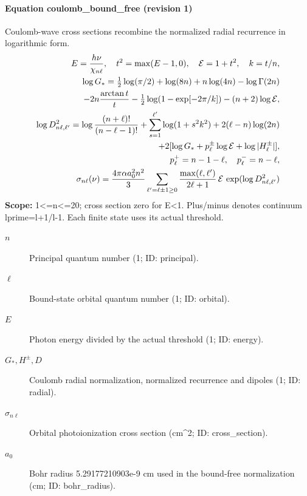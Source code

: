 \paragraph{Equation coulomb\_bound\_free (revision 1)}
Coulomb-wave cross sections recombine the normalized radial recurrence in logarithmic form.
\begin{equation}
\begin{aligned}
E=\frac{h\nu}{\chi_{n\ell}},\quad t^2=\max(E-1,0),\quad \mathcal E=1+t^2,\quad k=t/n,\\
\log G_* =\tfrac12\log(\pi/2)+\log(8n)+n\log(4n)-\log\Gamma(2n)\\
\hspace{7mm}-2n\frac{\arctan t}{t}-\tfrac12\log(1-\exp[-2\pi/k])-(n+2)\log\mathcal E,\\
\log D_{n\ell,\ell'}^2=\log\frac{(n+\ell)!}{(n-\ell-1)!}
 +\sum_{s=1}^{\ell'}\log(1+s^2k^2)+2(\ell-n)\log(2n)\\
\hspace{7mm}+2[\log G_*+p_\ell^\pm\log\mathcal E+\log|H_\ell^\pm|],\\
p_\ell^+=n-1-\ell,\quad p_\ell^-=n-\ell,\\
\sigma_{n\ell}(\nu)=\frac{4\pi\alpha a_0^2n^2}{3}
 \sum_{\ell'=\ell\pm1\ge0}\frac{\max(\ell,\ell')}{2\ell+1}\,\mathcal E\,\exp(\log D_{n\ell,\ell'}^2)
\end{aligned}
\label{eq:escape.atom_5f_convergence:coulomb_5f_bound_5f_free:1}
\end{equation}
\noindent\textbf{Scope:} 1<=n<=20; cross section zero for E<1. Plus/minus denotes continuum lprime=l+1/l-1. Each finite state uses its actual threshold.

\begin{description}
\item[$n$] Principal quantum number (1; ID: principal).
\item[$\ell$] Bound-state orbital quantum number (1; ID: orbital).
\item[$E$] Photon energy divided by the actual threshold (1; ID: energy).
\item[$G_*,H^\pm,D$] Coulomb radial normalization, normalized recurrence and dipoles (1; ID: radial).
\item[$\sigma_{n\ell}$] Orbital photoionization cross section (cm\textasciicircum{}2; ID: cross\_section).
\item[$a_0$] Bohr radius 5.29177210903e-9 cm used in the bound-free normalization (cm; ID: bohr\_radius).
\end{description}

